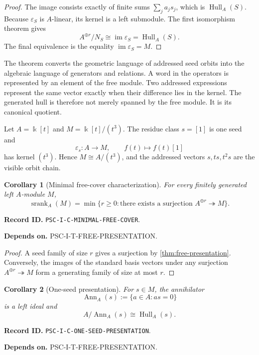 \documentclass[11pt]{article}
\newtheorem{corollary}[corollary]{Corollary}
\theoremstyle{definition}
\theoremstyle{remark}
\newcommand{\bbk}{\Bbbk}
\newcommand{\Hull}{\operatorname{Hull}}
\newcommand{\srank}{\operatorname{srank}}
\newcommand{\im}{\operatorname{im}}
\newcommand{\RecordID}[1]{\par\smallskip\noindent\begingroup\footnotesize\color{PSCGray}\raggedright\textbf{Record ID.} \nolinkurl{#1}.\par\endgroup}
\newcommand{\Depends}[1]{\par\noindent\begingroup\footnotesize\color{PSCGray}\raggedright\textbf{Depends on.} #1\par\endgroup}
\begin{document}
\begin{proof}
The image consists exactly of finite sums $\sum_ja_js_j$, which is $\Hull_A(S)$.  Because $\varepsilon_S$ is $A$-linear, its kernel is a left submodule.  The first isomorphism theorem gives
\[
A^{\oplus r}/N_S\cong\im\varepsilon_S=\Hull_A(S).
\]
The final equivalence is the equality $\im\varepsilon_S=M$.
\end{proof}

\begin{interpretation}
The theorem converts the geometric language of addressed seed orbits into the algebraic language of generators and relations.  A word in the operators is represented by an element of the free module.  Two addressed expressions represent the same vector exactly when their difference lies in the kernel.  The generated hull is therefore not merely spanned by the free module.  It is its canonical quotient.
\end{interpretation}

\begin{microexample}[title={A cyclic nilpotent chain}]
Let \(A=\bbk[t]\) and \(M=\bbk[t]/(t^3)\).  The residue class \(s=[1]\) is one seed and
\[
\varepsilon_s:A\to M,
\qquad
f(t)\mapsto f(t)[1]
\]
has kernel \((t^3)\).  Hence \(M\cong A/(t^3)\), and the addressed vectors \(s,ts,t^2s\) are the visible orbit chain.
\end{microexample}


\begin{corollary}[Minimal free-cover characterization]
\label{cor:minimal-free-cover}
For every finitely generated left $A$-module $M$,
\[
\boxed{
\srank_A(M)=\min\{r\geq0:\text{there exists a surjection }A^{\oplus r}\twoheadrightarrow M\}.
}
\]
\end{corollary}
\RecordID{PSC-I-C-MINIMAL-FREE-COVER}
\Depends{PSC-I-T-FREE-PRESENTATION.}

\begin{proof}
A seed family of size $r$ gives a surjection by \cref{thm:free-presentation}.  Conversely, the images of the standard basis vectors under any surjection $A^{\oplus r}\twoheadrightarrow M$ form a generating family of size at most $r$.
\end{proof}

\begin{corollary}[One-seed presentation]
\label{cor:one-seed-presentation}
For $s\in M$, the annihilator
\[
\operatorname{Ann}_A(s):=\{a\in A:as=0\}
\]
is a left ideal and
\[
\boxed{A/\operatorname{Ann}_A(s)\cong\Hull_A(s).}
\]
\end{corollary}
\RecordID{PSC-I-C-ONE-SEED-PRESENTATION}
\Depends{PSC-I-T-FREE-PRESENTATION.}
\end{document}
